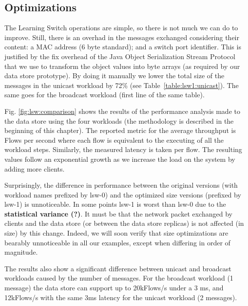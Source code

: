 \subsection{Optimizations}
\label{sec:optimizations-2}
The Learning Switch operations are simple, so there is not much we can do to improve. 
Still, there is an overhad in the messages exchanged considering their content: a MAC address (6 byte standard); and a switch port identifier.  
This  is justified by the fix overhead of the Java Object Serialization Stream Protocol that we use to transform the object values into byte arrays (as required by our data store prototype). 
By doing it  manually  we lower the total size of the messages in the unicast workload by 72\% (see Table~\ref{table:lsw1:unicast}). The same goes for the broadcast workload (first line of the same table). 

Fig. \ref{fig:lsw:comparison} shows the results of the performance analysis made to the data store using the four workloads (the methodology is described in the beginning of this chapter). 
The reported metric for the average throughput  is Flows per second where each flow  is equivalent to the executing of all the workload steps. Similarly, the measured latency is taken per flow. 
The resulting values follow an exponential growth as we increase the load on the system by adding more clients. 

Surprisingly, the difference in performance between the original versions (with workload names prefixed by lsw-0) and the optimized size versions (prefixed by lsw-1) is unnoticeable. In some points lsw-1 is worst than lsw-0 due to the \textbf{statistical variance (?)}. 
It must be that the network packet exchanged by clients and the data store (or between the data store replicas) is  not affected (in size) by this change. 
Indeed, we will soon verify that size optimizations are bearably unnoticeable in all our examples, except when differing in order of magnitude. 

The results also show a significant difference between unicast and broadcast workloads caused by the number of messages. 
For the broadcast workload (1 message) the data store can support up to 20kFlows/s under a 3 ms, and 
12kFlows/s with the same 3ms latency  for the unicast workload (2 messages). 

